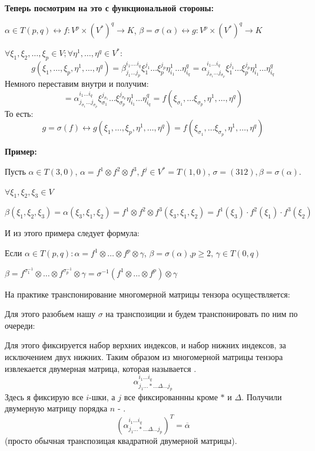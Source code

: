 \textbf{Теперь посмотрим на это с функциональной стороны:}

$\alpha \in T(p,q) \leftrightarrow f: V^p \times (V^*)^q \rightarrow K$, $\beta = \sigma(\alpha) \leftrightarrow g: V^p\times (V^*)^q\rightarrow K$

$\forall \xi_1,\xi_2,\ldots, \xi_p \in V;\forall \eta^1,\ldots,\eta^q \in V^*:$
$$g(\xi_1, \ldots, \xi_p, \eta^1,\ldots, \eta^q) = \beta_{j_1\ldots j_p}^{i_1.\ldots i_q} \xi_1^{j_1}\ldots \xi_{p}^{j_p}\eta_{i_1}^1 \ldots \eta_{i_q}^q = \alpha_{j_{\sigma_1}\ldots j_{\sigma_p}}^{i_1\ldots i_q} \xi_1^{j_1}\ldots \xi^{j_p}_p \eta_{i_1}^1 \ldots \eta_{i_q}^q $$
Немного переставим внутри и получим:
$$=\alpha_{j_{\sigma_1}\ldots j_{\sigma_p}}^{i_1\ldots i_q} \xi_{\sigma_1}^{j_{\sigma_1}}\ldots \xi^{j_{\sigma_p}}_{\sigma_p} \eta_{i_1}^1 \ldots \eta_{i_q}^q = f(\xi_{\sigma_1},\ldots \xi_{\sigma_p}, \eta^1,\ldots, \eta^q)$$
То есть:
$$g = \sigma(f) \leftrightarrow g(\xi_1,\ldots, \xi_p, \eta^1, \ldots, \eta^q) = f(\xi_{\sigma_1},\ldots \xi_{\sigma_p}, \eta^1,\ldots, \eta^q)$$

\textbf{Пример:}

Пусть $\alpha \in T(3,0)$, $\alpha = f^1 \otimes f^2 \otimes f^3, f^j \in V^* = T(1,0)$, $\sigma = (312), \beta = \sigma(\alpha)$.

$\forall \xi_1,\xi_2,\xi_3 \in V$

$\beta(\xi_1,\xi_2,\xi_3) = \alpha(\xi_3,\xi_1,\xi_2) = f^1\otimes f^2 \otimes f^3 (\xi_3,\xi_1,\xi_2) = f^1(\xi_3)\cdot f^2(\xi_1)\cdot f^3(\xi_2)$

И из этого примера следует формула:

Если $\alpha \in T(p,q): \alpha = f^1 \otimes \ldots \otimes f^p \otimes \gamma $, $\beta = \sigma(\alpha)$,$p\geq 2$, $\gamma \in T(0,q)$

$\beta = f^{\sigma_1^{-1}}\otimes \ldots \otimes f^{\sigma_p^{-1}} \otimes \gamma = \sigma^{-1}(f^1\otimes \ldots \otimes f^p) \otimes \gamma$

На практике транспонирование многомерной матрицы тензора осуществляется:


Для этого разобьем нашу $\sigma$ на транспозиции и будем транспонировать по ним по очереди:

Для этого фиксируется набор верхних индексов,  и набор нижних индексов, за исключением двух нижних. Таким образом из многомерной матрицы тензора извлекается двумерная матрица, которая называется .
$$\alpha^{i_1\ldots i_q}_{j_1 \ldots * \ldots \Delta \ldots j_p}$$ 
Здесь я фиксирую все $i$-шки, а $j$ все фиксированнны кроме $*$  и $\Delta$. Получили двумерную матрицу порядка $n$ - . 
$$(\alpha_{j_1\ldots * \ldots \Delta \ldots j_p}^{i_1 \ldots i_q})^T = \overline{\alpha}$$
(просто обычная транспозицая квадратной двумерной матрицы).

